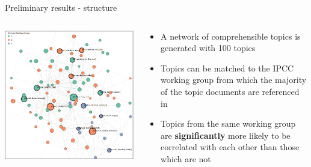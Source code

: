 \documentclass[9pt]{beamer}
\begin{document}
\begin{frame}{Preliminary results - structure}

\begin{columns}
	\begin{column}{0.65\linewidth}
		\begin{center}	
			\vspace*{-0.1\linewidth}
			\includegraphics[width=\linewidth]{../plots/network_wg_654}
		\end{center}
	\end{column}
	\begin{column}{0.35\linewidth}
		\begin{center}
			\begin{itemize}
				\item A network of comprehensible topics is generated with 100 topics
				\item Topics can be matched to the IPCC working group from which the majority of the topic documents are referenced in
				\item Topics from the same working group are \textbf{significantly} more likely to be correlated with each other than those which are not
			\end{itemize}
		\end{center}
	\end{column}
\end{columns}

\end{frame}
\end{document}
